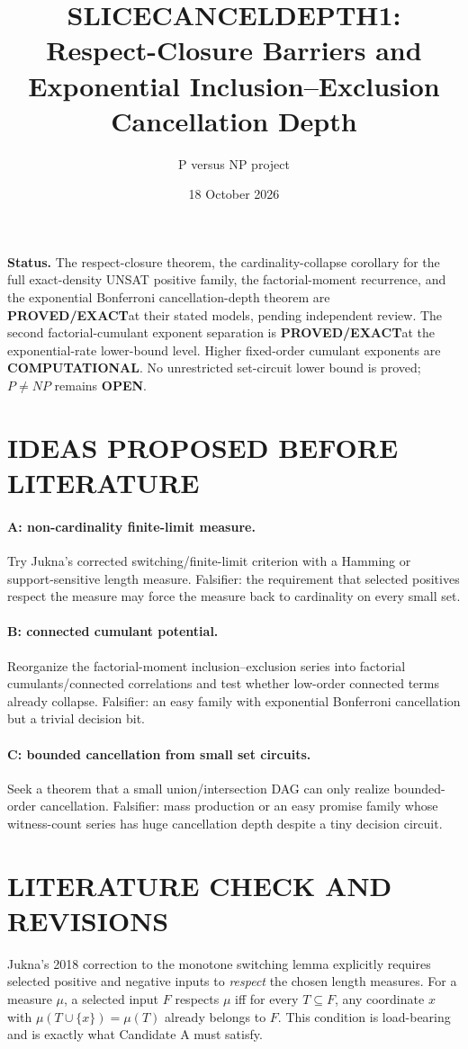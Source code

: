 \documentclass[11pt]{article}
\title{SLICECANCELDEPTH1:\\Respect-Closure Barriers and Exponential Inclusion--Exclusion Cancellation Depth}
\author{P versus NP project}
\date{18 October 2026}
\newcommand{\EXACT}{\textbf{PROVED/EXACT}}
\newcommand{\COMP}{\textbf{COMPUTATIONAL}}
\newcommand{\OPEN}{\textbf{OPEN}}
\begin{document}
\maketitle

\noindent\textbf{Status.} The respect-closure theorem, the cardinality-collapse corollary for the full exact-density UNSAT positive family, the factorial-moment recurrence, and the exponential Bonferroni cancellation-depth theorem are \EXACT at their stated models, pending independent review. The second factorial-cumulant exponent separation is \EXACT at the exponential-rate lower-bound level. Higher fixed-order cumulant exponents are \COMP. No unrestricted set-circuit lower bound is proved; $P\ne NP$ remains \OPEN.

\section{IDEAS PROPOSED BEFORE LITERATURE}
\paragraph{A: non-cardinality finite-limit measure.} Try Jukna's corrected switching/finite-limit criterion with a Hamming or support-sensitive length measure. Falsifier: the requirement that selected positives respect the measure may force the measure back to cardinality on every small set.
\paragraph{B: connected cumulant potential.} Reorganize the factorial-moment inclusion--exclusion series into factorial cumulants/connected correlations and test whether low-order connected terms already collapse. Falsifier: an easy family with exponential Bonferroni cancellation but a trivial decision bit.
\paragraph{C: bounded cancellation from small set circuits.} Seek a theorem that a small union/intersection DAG can only realize bounded-order cancellation. Falsifier: mass production or an easy promise family whose witness-count series has huge cancellation depth despite a tiny decision circuit.

\section{LITERATURE CHECK AND REVISIONS}
Jukna's 2018 correction to the monotone switching lemma explicitly requires selected positive and negative inputs to \emph{respect} the chosen length measures. For a measure $\mu$, a selected input $F$ respects $\mu$ iff for every $T\subseteq F$, any coordinate $x$ with $\mu(T\cup\{x\})=\mu(T)$ already belongs to $F$. This condition is load-bearing and is exactly what Candidate A must satisfy.
\end{document}
